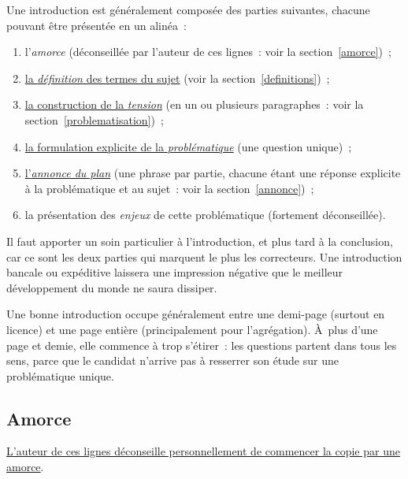 \documentclass[a4paper,12pt]{article}
\begin{document}
Une introduction est généralement composée des parties suivantes,
chacune pouvant être présentée en un alinéa :

\begin{enumerate}
\item l'\emph{amorce} (déconseillée par l'auteur de ces lignes : voir la
section \ref{amorce}) ;

\item \uline{la \emph{définition} des termes du sujet} (voir la section \ref{definitions}) ;

\item \uline{la construction de la \emph{tension}} (en un ou plusieurs paragraphes :
voir la section \ref{problematisation}) ;

\item \uline{la formulation explicite de la \emph{problématique}} (une question
unique) ;

\item \uline{l'\emph{annonce du plan}} (une phrase par partie, chacune étant une
réponse explicite à la problématique et au sujet : voir la
section \ref{annonce}) ;

\item la présentation des \emph{enjeux} de cette problématique (fortement
déconseillée).
\end{enumerate}

Il faut apporter un soin particulier à l'introduction, et plus tard à la
conclusion, car ce sont les deux parties qui marquent le plus les
correcteurs. Une introduction bancale ou expéditive laissera une
impression négative que le meilleur développement du monde ne saura
dissiper.

Une bonne introduction occupe généralement entre une demi-page (surtout
en licence) et une page entière (principalement pour l'agrégation).
À plus d'une page et demie, elle commence à trop s'étirer : les
questions partent dans tous les sens, parce que le candidat n'arrive pas
à resserrer son étude sur une problématique unique.

\subsection{Amorce}
\label{sec-2-1}
\label{amorce}

\uline{L'auteur de ces lignes déconseille personnellement de commencer la
copie par une amorce}.
\end{document}
